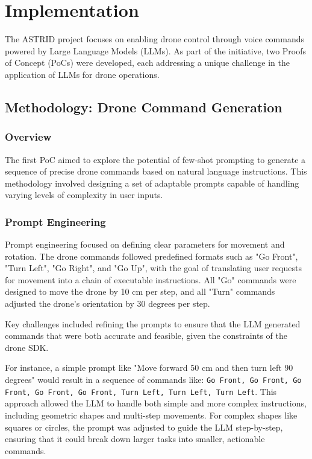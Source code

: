 \chapter{Implementation}
\label{implementation}

The \ac{ASTRID} project focuses on enabling drone control through voice commands powered by Large Language Models (\acp{LLM}). 
As part of the initiative, two Proofs of Concept (\acp{PoC}) were developed, each addressing a unique challenge in the application of \acp{LLM} for drone operations.

\section{Methodology: Drone Command Generation}
\subsection{Overview}
The first \ac{PoC} aimed to explore the potential of few-shot prompting to generate a sequence of precise drone commands based on natural language instructions. 
This methodology involved designing a set of adaptable prompts capable of handling varying levels of complexity in user inputs.

\subsection{Prompt Engineering}
Prompt engineering focused on defining clear parameters for movement and rotation. The drone commands followed predefined formats such as "Go Front", "Turn Left", "Go Right", and "Go Up", 
with the goal of translating user requests for movement into a chain of executable instructions. 
All "Go" commands were designed to move the drone by 10 cm per step, and all "Turn" commands adjusted the drone's orientation by 30 degrees per step.

Key challenges included refining the prompts to ensure that the \ac{LLM} generated commands that were both accurate and feasible, given the constraints of the drone \ac{SDK}.

For instance, a simple prompt like "Move forward 50 cm and then turn left 90 degrees" would result in a sequence of commands like:  
\texttt{Go Front, Go Front, Go Front, Go Front, Go Front, Turn Left, Turn Left, Turn Left}.  
This approach allowed the \ac{LLM} to handle both simple and more complex instructions, including geometric shapes and multi-step movements. 
For complex shapes like squares or circles, the prompt was adjusted to guide the \ac{LLM} step-by-step, ensuring that it could break down larger tasks into smaller, actionable commands.

